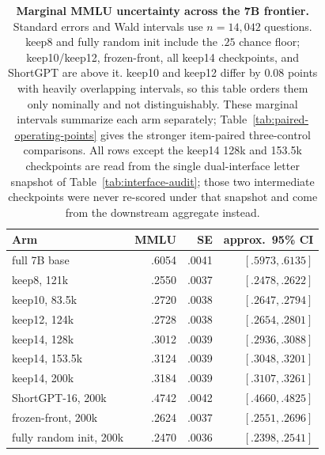 \begin{table}[t]
\centering
\scriptsize
\setlength{\tabcolsep}{3pt}
\begin{tabular}{@{}lrrr@{}}
\toprule
\textbf{Arm} & \textbf{MMLU} & \textbf{SE} & \textbf{approx.\ 95\% CI} \\
\midrule
full 7B base & .6054 & .0041 & $[.5973,.6135]$ \\
keep8, 121k & .2550 & .0037 & $[.2478,.2622]$ \\
keep10, 83.5k & .2720 & .0038 & $[.2647,.2794]$ \\
keep12, 124k & .2728 & .0038 & $[.2654,.2801]$ \\
keep14, 128k & .3012 & .0039 & $[.2936,.3088]$ \\
keep14, 153.5k & .3124 & .0039 & $[.3048,.3201]$ \\
keep14, 200k & .3184 & .0039 & $[.3107,.3261]$ \\
ShortGPT-16, 200k & .4742 & .0042 & $[.4660,.4825]$ \\
frozen-front, 200k & .2624 & .0037 & $[.2551,.2696]$ \\
fully random init, 200k & .2470 & .0036 & $[.2398,.2541]$ \\
\bottomrule
\end{tabular}
\caption{\textbf{Marginal MMLU uncertainty across the 7B frontier.} Standard
errors and Wald intervals use $n=14{,}042$ questions. keep8 and
fully random init include the $.25$ chance floor; keep10/keep12,
frozen-front, all keep14 checkpoints, and ShortGPT are above it. keep10 and
keep12 differ by $0.08$ points with heavily overlapping intervals, so this
table orders them only nominally and not distinguishably. These marginal intervals summarize each
arm separately; Table~\ref{tab:paired-operating-points} gives the stronger item-paired
three-control comparisons. All rows except the keep14 128k and 153.5k
checkpoints are read from the single dual-interface letter snapshot of
Table~\ref{tab:interface-audit}; those two intermediate checkpoints were never
re-scored under that snapshot and come from the downstream aggregate instead.}
\label{tab:app-mmlu-ci}
\end{table}
